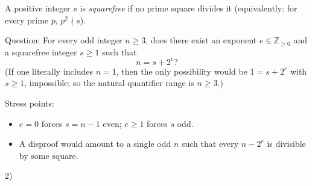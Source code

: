 A positive integer $s$ is \emph{squarefree} if no prime square divides it (equivalently: for every prime $p$, $p^2\nmid s$).

Question: For every odd integer $n\ge 3$, does there exist an exponent $e\in\mathbb{Z}_{\ge 0}$ and a squarefree integer $s\ge 1$ such that
\[
 n = s + 2^e?
\]
(If one literally includes $n=1$, then the only possibility would be $1=s+2^e$ with $s\ge 1$, impossible; so the natural quantifier range is $n\ge 3$.)

Stress points:
\begin{itemize}
\item $e=0$ forces $s=n-1$ even; $e\ge 1$ forces $s$ odd.
\item A disproof would amount to a single odd $n$ such that every $n-2^e$ is divisible by some square.
\end{itemize}

2)
